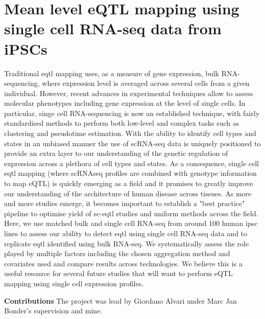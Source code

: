 
\chapter{Mean level eQTL mapping using single cell RNA-seq data from iPSCs}

Traditional \gls{eqtl} mapping uses, as a measure of gene expression, bulk RNA-sequencing, where expression level is averaged across several cells from a given individual.
However, recent advances in experimental techniques allow to assess molecular phenotypes including gene expression at the level of single cells.
In particular, singe cell RNA-sequencing is now an established technique, with fairly standardised methods to perform both low-level and complex tasks such as clustering and pseudotime estimation.
With the ability to identify cell types and states in an unbiased manner the use of scRNA-seq data is uniquely positioned to provide an extra layer to our understanding of the genetic regulation of expression across a plethora of cell types and states.
As a consequence, single cell \gls{eqtl} mapping (where scRNAseq profiles are combined with genotype information to map eQTL) is quickly emerging as a field and it promises to greatly improve our understanding of the architecture of human disease across tissues.
As more and more studies emerge, it becomes important to establish a "best practice" pipeline to optimise yield of sc-\gls{eqtl} studies and uniform methods across the field.
Here, we use matched bulk and single cell RNA-seq from around 100 human \gls{ipsc} lines to assess our ability to detect \gls{eqtl} using single cell RNA-seq data and to replicate \gls{eqtl} identified using bulk RNA-seq.
We systematically assess the role played by multiple factors including the chosen aggregation method and covariates used and compare results across technologies.
We believe this is a useful resource for several future studies that will want to perform eQTL mapping using single cell expression profiles.

\newpage

\begin{Comment2}
\hspace{-3mm}\textbf{Contributions} 
The project was lead by Giordano Alvari under Marc Jan Bonder's supervision and mine.
\end{Comment2}

